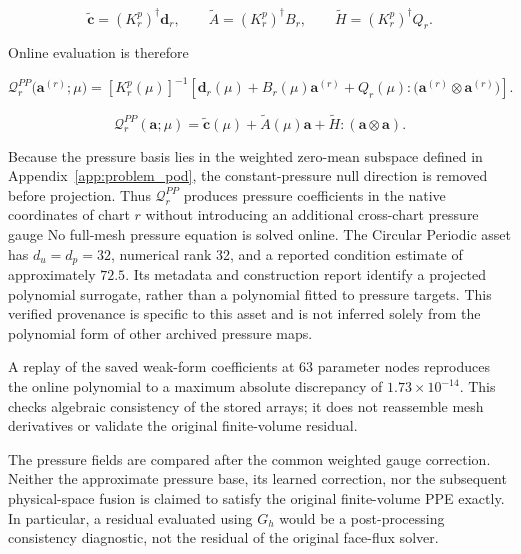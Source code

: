 \documentclass{article}
\providecommand{\DIFaddtex}[1]{{\protect\color{blue} \sf #1}} %
\providecommand{\DIFdeltex}[1]{{\protect\color{red} \scriptsize #1}} %
\providecommand{\DIFaddbegin}{} %
\providecommand{\DIFaddend}{} %
\providecommand{\DIFdelbegin}{} %
\providecommand{\DIFdelend}{} %
\providecommand{\DIFadd}[1]{\texorpdfstring{\DIFaddtex{#1}}{#1}} %
\providecommand{\DIFdel}[1]{\texorpdfstring{\DIFdeltex{#1}}{}} %
\begin{document}
{\color{blue}
\begin{equation}
 \widetilde{\bm c}=(K_r^p)^\dagger\bm d_r,\qquad
 \widetilde A=(K_r^p)^\dagger B_r,\qquad
 \widetilde H=(K_r^p)^\dagger Q_r.
\end{equation}
}



\DIFadd{Online evaluation }\DIFaddend is therefore


\DIFdelbegin 
{\color{red}
\begin{equation}
    \mathcal Q_r^{PP}
    \bigl(
        \bm a^{(r)};
        \mu
    \bigr)
    =
    [K_r^p(\mu)]^{-1}
    \left[
        \bm d_r(\mu)
        +
        B_r(\mu)\bm a^{(r)}
        +
        Q_r(\mu):
        \bigl(
            \bm a^{(r)}\otimes\bm a^{(r)}
        \bigr)
    \right].
    \label{old:eq:app_pressure_poisson_map}
\end{equation}
}
\DIFdelend \DIFaddbegin 
{\color{blue}
\begin{equation}
 \mathcal Q_r^{PP}(\bm a;\mu)
 =\widetilde{\bm c}(\mu)+\widetilde A(\mu)\bm a+
   \widetilde H:(\bm a\otimes\bm a).
 \label{eq:app_pressure_poisson_map}
\end{equation}
}
\DIFaddend 


\DIFdelbegin \DIFdel{Because the pressure basis lies in the weighted zero-mean subspace defined in
Appendix~\ref{app:problem_pod}, the constant-pressure null direction is removed before projection. Thus $\mathcal Q_r^{PP}$ produces pressure coefficients in the native
coordinates of chart $r$ without introducing an additional cross-chart
pressure gauge}\DIFdelend \DIFaddbegin \DIFadd{No full-mesh pressure equation is solved online. The Circular Periodic asset has $d_u=d_p=32$, numerical rank 32, and a reported condition estimate of approximately $72.5$. Its metadata and construction report identify a projected polynomial surrogate, rather than a polynomial fitted to pressure targets. This verified provenance is specific to this asset and is not inferred solely from the polynomial form of other archived pressure maps.
}

\DIFadd{A replay of the saved weak-form coefficients at 63 parameter nodes reproduces the online polynomial to a maximum absolute discrepancy of $1.73\times10^{-14}$. This checks algebraic consistency of the stored arrays; it does not reassemble mesh derivatives or validate the original finite-volume residual.
}

\DIFadd{The pressure fields are compared after the common weighted gauge correction. Neither the approximate pressure base, its learned correction, nor the subsequent physical-space fusion is claimed to satisfy the original finite-volume PPE exactly. In particular, a residual evaluated using $G_h$ would be a post-processing consistency diagnostic, not the residual of the original face-flux solver}\DIFaddend .
\end{document}
